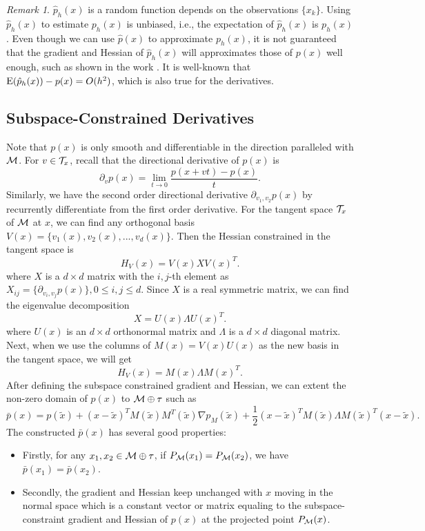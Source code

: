 \documentclass[aos,preprint]{imsart}
\theoremstyle{remark}
\newtheorem*{remark}{Remark}
\begin{document}
\begin{remark}   
 $\hat{p}_h(x)$ is a random function depends on the observations $\{x_k\}$. Using $\hat{p}_h(x)$ to estimate $p_h(x)$ is unbiased, i.e., the expectation of $\hat{p}_h(x)$ is $p_h(x)$. Even though we can use $ \hat{p}(x)$ to approximate $p_h(x)$, it is not guaranteed that the gradient and Hessian of $\hat{p}_h(x)$ will approximates those of $p(x)$ well enough, such as shown in the work \cite{sasaki2017mode}.
  It is well-known that ${\rm E}(\hat{p}_h(x))-p(x) = O(h^2)$, which is also true for the derivatives.
\end{remark}


\subsection{Subspace-Constrained Derivatives}
Note that $p(x)$ is only smooth and differentiable in the direction paralleled with $\cal M$. For $v\in {\cal T}_x$, recall that the directional derivative of $p(x)$ is
\[
 \partial_v p(x) = \lim_{t\rightarrow 0} \frac{p(x+vt)-p(x)}{t}.
\]
Similarly, we have the second order directional derivative $\partial_{v_1,v_2}p(x)$ by recurrently differentiate from the first order derivative. For the tangent space ${\cal T}_x$ of $\cal M$ at $x$, we can find any orthogonal basis $V(x) = \{v_1(x), v_2(x),..., v_d(x)\}$. Then the Hessian constrained in the tangent space is
\[
H_{ V}(x) = V(x) X V(x)^T.
\]
where $X$ is a $d\times d$ matrix with the $i,j$-th element as $X_{ij}=  \{ \partial_{v_i,v_j} p(x )\}, 0\leq i,j \leq d$. Since $X$ is a real symmetric matrix, we can find the eigenvalue decomposition 
\[
X = U(x) \Lambda U(x)^T.
\]
where $U(x)$ is an $d\times d$ orthonormal matrix and $\Lambda$ is a $d\times d$ diagonal matrix. Next, when we use the columns of $M(x) = V(x)U(x)$ as the new basis in the tangent space, we will get 
\[
H_{V}(x) = M(x) \Lambda M(x)^T.
\]
After defining the subspace constrained gradient and Hessian, we can extent the non-zero domain of $p(x)$ to  $\cal M\oplus \tau$ such as
\[
\bar{p}(x) = p(\tilde{x}) + (x-\tilde{x})^T M(\tilde{x}) M^T(\tilde{x}) \nabla p_M (\tilde{x}) +\frac{1}{2}  (x-\tilde{x})^TM(\tilde{x})\Lambda M(\tilde{x})^T (x-\tilde{x}).
\]
The constructed $\bar{p}(x)$ has several good properties: 
\begin{itemize}
\item Firstly, for any $x_1,x_2 \in \cal M\oplus \tau$, if $P_{\cal M}(x_1) = P_{\cal M}(x_2)$, we have $\bar{p}(x_1) = \bar{p}(x_2)$. 
\item Secondly, the gradient and Hessian keep unchanged with $x$ moving in the normal space which is a constant vector or matrix equaling to the subspace-constraint gradient and Hessian of $p(x)$ at the projected point $P_{\cal M}(x)$.
\end{itemize}
\end{document}
